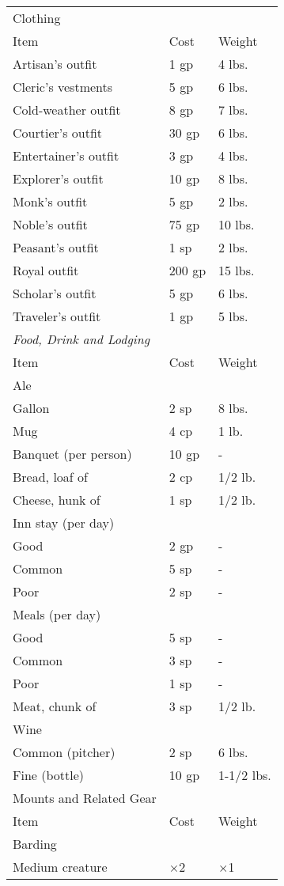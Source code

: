 \begin{xtabular}{lll}
Clothing \\
 Item & Cost & Weight\\
Artisan's outfit & 1 gp & 4 lbs. \\
 Cleric's vestments & 5 gp & 6 lbs. \\
 Cold-weather outfit & 8 gp & 7 lbs. \\
 Courtier's outfit & 30 gp & 6 lbs. \\
 Entertainer's outfit & 3 gp & 4 lbs. \\
 Explorer's outfit & 10 gp & 8 lbs. \\
 Monk's outfit & 5 gp & 2 lbs. \\
 Noble's outfit & 75 gp & 10 lbs. \\
 Peasant's outfit & 1 sp & 2 lbs. \\
 Royal outfit & 200 gp & 15 lbs. \\
 Scholar's outfit & 5 gp & 6 lbs. \\
 Traveler's outfit & 1 gp & 5 lbs.\\
\textit{Food, Drink and Lodging}  \\
 Item & Cost & Weight\\
Ale  \\
 Gallon & 2 sp & 8 lbs. \\
 Mug & 4 cp & 1 lb. \\
 Banquet (per person) & 10 gp & - \\
 Bread, loaf of & 2 cp & 1/2 lb. \\
 Cheese, hunk of & 1 sp & 1/2 lb. \\
 Inn stay (per day)  \\
 Good & 2 gp & - \\
 Common & 5 sp & - \\
 Poor & 2 sp & - \\
 Meals (per day)  \\
 Good & 5 sp & - \\
 Common & 3 sp & - \\
 Poor & 1 sp & - \\
 Meat, chunk of & 3 sp & 1/2 lb. \\
 Wine  \\
 Common (pitcher) & 2 sp & 6 lbs. \\
 Fine (bottle) & 10 gp & 1-1/2 lbs.\\
Mounts and Related Gear  \\
 Item & Cost & Weight\\
Barding  \\
 Medium creature & $\times$2 & $\times$1 \\

\end{xtabular}
